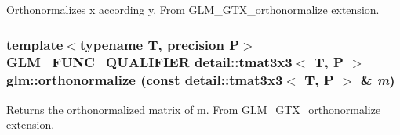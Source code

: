 Orthonormalizes x according y. From GLM\_\-GTX\_\-orthonormalize extension. \hypertarget{group__gtx__orthonormalize_ge0c06d8312a13b38747271ea68f00121}{
\subsubsection[orthonormalize]{\setlength{\rightskip}{0pt plus 5cm}template$<$typename T, precision P$>$ GLM\_\-FUNC\_\-QUALIFIER detail::tmat3x3$<$ T, P $>$ glm::orthonormalize (const detail::tmat3x3$<$ T, P $>$ \& {\em m})}}
\label{group__gtx__orthonormalize_ge0c06d8312a13b38747271ea68f00121}


Returns the orthonormalized matrix of m. From GLM\_\-GTX\_\-orthonormalize extension. 